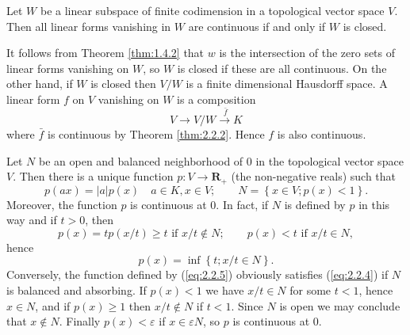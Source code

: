 \begin{cor}\label{cor:2.2.3}
  Let $W$ be a linear subspace of finite codimension in a topological
  vector space $V$. Then all linear forms vanishing in $W$ are
  continuous if and only if $W$ is closed.
\end{cor}
\begin{prf}
  It follows from Theorem \ref{thm:1.4.2} that $w$ is the intersection
  of the zero sets of linear forms vanishing on $W$, so $W$ is closed
  if these are all continuous. On the other hand, if $W$ is closed
  then $V/W$ is a finite dimensional Hausdorff space. A linear form
  $f$ on $V$ vanishing on $W$ is a composition
  \begin{displaymath}
    V\to V/W\xrightarrow{\ \bar{f}}K
  \end{displaymath}
  where $\bar{f}$ is continuous by Theorem \ref{thm:2.2.2}. Hence $f$
  is also continuous.
\end{prf}
Let $N$ be an open and balanced neighborhood of $0$ in the
topological vector space $V$. Then there is a unique function $p:V\to
\mathbf{R}_{+}$ (the non-negative reals) such that
  \begin{equation}
    \label{eq:2.2.4} p(ax)=|a|p(x)\quad a\in K,x\in V;\qquad N=\left\{
x\in V;p(x)<1 \right\}.
  \end{equation} Moreover, the function $p$ is continuous at $0$. In
fact, if $N$ is defined by $p$ in this way and if $t>0$, then
  \begin{displaymath} p(x)=tp(x/t)\geq t \text{ if } x/t\notin
N;\qquad p(x)<t\text{ if }x/t\in N,
  \end{displaymath} hence
  \begin{equation}
    \label{eq:2.2.5} p(x)=\inf \left\{ t;x/t\in N \right\}.
  \end{equation} Conversely, the function defined by (\ref{eq:2.2.5})
obviously satisfies (\ref{eq:2.2.4}) if $N$ is balanced and
absorbing. If $p(x)<1$ we have $x/t\in N$ for some $t<1$, hence $x\in
N$, and if $p(x)\geq1$ then $x/t\notin N$ if $t<1$. Since $N$ is open
we may conclude that $x\notin N$. Finally $p(x)<\varepsilon$ if
$x\in\varepsilon N$, so $p$ is continuous at $0$.

